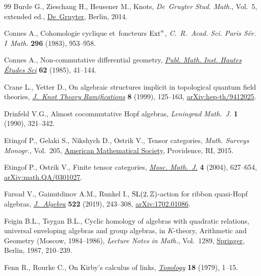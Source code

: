 \documentclass[10pt,a4paper]{amsart}
\numberwithin{equation}{section}
\begin{document}
\begin{thebibliography}{99}
Burde G., Zieschang H., Heusener M., Knots, \textit{De~Gruyter Stud. Math.},
 Vol.~5, {e}xtended ed.,
 \href{https://doi.org/10.1515/9783110270785}{De~Gruyter}, Berlin, 2014.

Connes A., Cohomologie cyclique et~foncteurs {${\rm Ext}^n$},
 \textit{C.~R.~Acad. Sci. Paris S\'er. I~Math.} \textbf{296} (1983), 953--958.

Connes A., Non-commutative differential geometry,
 \href{https://doi.org/10.1007/BF02698807}{\textit{Publ. Math. Inst. Hautes
 \'Etudes Sci}} \textbf{62} (1985), 41--144.

Crane L., Yetter D., On algebraic structures implicit in topological quantum
 field theories,
 \href{https://doi.org/10.1142/S0218216599000109}{\textit{J.~Knot Theory
 Ramifications}} \textbf{8} (1999), 125--163,
 \href{http://arxiv.org/abs/hep-th/9412025}{arXiv:hep-th/9412025}.

Drinfeld V.G., Almost cocommutative {H}opf algebras, \textit{Leningrad
 Math.~J.} \textbf{1} (1990), 321--342.

Etingof P., Gelaki S., Nikshych D., Ostrik V., Tensor categories, \textit{Math.
 Surveys Monogr.}, Vol.~205, \href{https://doi.org/10.1090/surv/205}{American
 Mathematical Society}, Providence, RI, 2015.

Etingof P., Ostrik V., Finite tensor categories,
 \href{https://doi.org/10.17323/1609-4514-2004-4-3-627-654}{\textit{Mosc.
 Math.~J.}} \textbf{4} (2004), 627--654,
 \href{http://arxiv.org/abs/math.QA/0301027}{arXiv:math.QA/0301027}.

Farsad V., Gainutdinov A.M., Runkel I., {${\rm SL}(2,\mathbb{Z})$}-action for
 ribbon quasi-{H}opf algebras,
 \href{https://doi.org/10.1016/j.jalgebra.2018.12.012}{\textit{J.~Algebra}}
 \textbf{522} (2019), 243--308,
 \href{http://arxiv.org/abs/1702.01086}{arXiv:1702.01086}.

Feigin B.L., Tsygan B.L., Cyclic homology of algebras with quadratic relations,
 universal enveloping algebras and group algebras, in {$K$}-theory, Arithmetic
 and Geometry ({M}oscow, 1984--1986), \textit{Lecture Notes in Math.}, Vol.~1289, \href{https://doi.org/10.1007/BFb0078369}{Springer}, Berlin, 1987,
 210--239.

Fenn R., Rourke C., On {K}irby's calculus of links,
 \href{https://doi.org/10.1016/0040-9383(79)90010-7}{\textit{Topology}}
 \textbf{18} (1979), 1--15.


\end{thebibliography}
\end{document}
